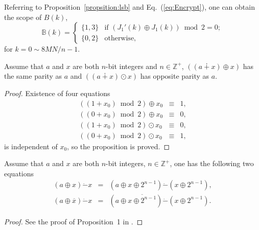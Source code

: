 \documentclass{ws-ijbc}
\begin{document}
Referring to Proposition~\ref{propsition:lsb} and Eq.~(\ref{eq:Encrypt}), one can obtain the scope of $B(k)$,
\begin{equation}
\mathbb{B}(k)=
\begin{cases}
\{1, 3\}  & \mbox{if } (J_1'(k)\oplus J_1(k))\bmod 2=0;\\
\{0, 2\}  & \mbox{otherwise},
\end{cases}
\label{eq:determinebits2}
\end{equation}
for $k=0\sim 8MN/n-1$.

\begin{proposition}
Assume that $a$ and $x$ are both $n$-bit integers and $n\in \mathbb{Z}^+$,
$((a\dotplus x)\oplus x)$ has the same parity as $a$ and $((a\dotplus x)\odot x)$ has opposite parity as $a$.
\label{propsition:lsb}
\end{proposition}
\begin{proof}
Existence of four equations
\begin{eqnarray*}
((1+x_0)\bmod 2)\oplus x_0 & \equiv & 1,\\
((0+x_0)\bmod 2)\oplus x_0 & \equiv & 0,\\
((1+x_0)\bmod 2)\odot x_0 &  \equiv & 0,\\
((0+x_0)\bmod 2)\odot x_0 &  \equiv & 1,
\end{eqnarray*}
is independent of $x_0$, so the proposition is proved.
\end{proof}

\begin{proposition}
Assume that $a$ and $x$ are both $n$-bit integers, $n\in \mathbb{Z}^+$, one has the following two equations
\begin{eqnarray*}
(a\oplus x)\dot{-}x            & = & (a\oplus x\oplus 2^{n-1})\dot{-}(x\oplus 2^{n-1}),           \label{eq:EquiKey1}\\
(a\oplus \overline{x})\dot{-}x & = & (a\oplus \overline{x\oplus 2^{n-1}})\dot{-}(x\oplus 2^{n-1}).\label{eq:EquiKey2}
\end{eqnarray*}
\label{propsition:msb}
\end{proposition}
\begin{proof}
See the proof of Proposition~1 in \cite{LCQ:MCKBA:IJBC11}.
\end{proof}
\end{document}
